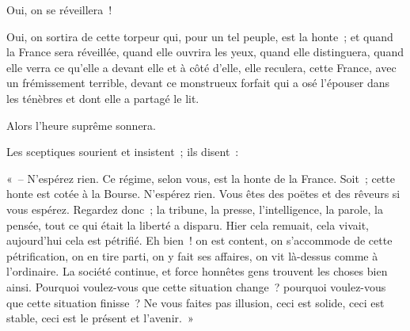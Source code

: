 \documentclass[french,twoside]{book} %
\newenvironment{quoteblock}%
  {\begin{quoting}}
  {\end{quoting}}
\newenvironment{quotebar}{%
    \def\FrameCommand{{\color{rubric!10!}\vrule width 0.5em} \hspace{0.9em}}%
    \def\OuterFrameSep{\itemsep} %
    \MakeFramed {\advance\hsize-\width \FrameRestore}
  }%
  {%
    \endMakeFramed
  }
\renewenvironment{quoteblock}%
  {%
    \savenotes
    \setstretch{0.9}
    \normalfont
    \begin{quotebar}
  }
  {%
    \end{quotebar}
    \spewnotes
  }
\begin{document}
Oui, on se réveillera !\par
Oui, on sortira de cette torpeur qui, pour un tel peuple, est la honte ; et quand la France sera réveillée, quand elle ouvrira les yeux, quand elle distinguera, quand elle verra ce qu’elle a devant elle et à côté d’elle, elle reculera, cette France, avec un frémissement terrible, devant ce monstrueux forfait qui a osé l’épouser dans les ténèbres et dont elle a partagé le lit.\par
Alors l’heure suprême sonnera.\par
Les sceptiques sourient et insistent ; ils disent :\par

\begin{quoteblock}
 \noindent « – N’espérez rien. Ce régime, selon vous, est la honte de la France. Soit ; cette honte est cotée à la Bourse. N’espérez rien. Vous êtes des poëtes et des rêveurs si vous espérez. Regardez donc ; la tribune, la presse, l’intelligence, la parole, la pensée, tout ce qui était la liberté a disparu. Hier cela remuait, cela vivait, aujourd’hui cela est pétrifié. Eh bien ! on est content, on s’accommode de cette pétrification, on en tire parti, on y fait ses affaires, on vit là-dessus comme à l’ordinaire. La société continue, et force honnêtes gens trouvent les choses bien ainsi. Pourquoi voulez-vous que cette situation change ? pourquoi voulez-vous que cette situation finisse ? Ne vous faites pas illusion, ceci est solide, ceci est stable, ceci est le présent et l’avenir. »
 \end{quoteblock}
\end{document}

